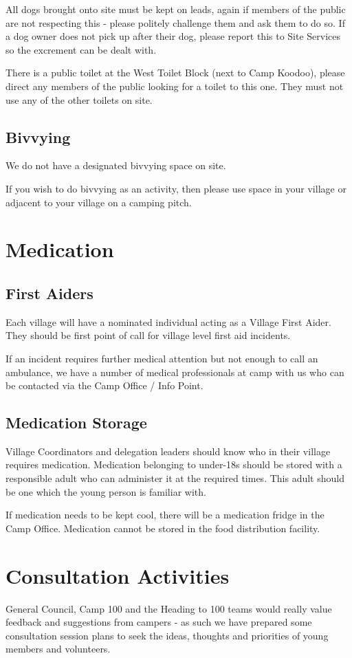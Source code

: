 \documentclass[a4paper, 11pt]{report}
\begin{document}
All dogs brought onto site must be kept on leads, again if members of the public are not respecting this - please politely challenge them and ask them to do so. If a dog owner does not pick up after their dog, please report this to Site Services so the excrement can be dealt with. \nl

There is a public toilet at the West Toilet Block (next to Camp Koodoo), please direct any members of the public looking for a toilet to this one. They must not use any of the other toilets on site.

\section{Bivvying}
We do not have a designated bivvying space on site.\nl

If you wish to do bivvying as an activity, then please use space in your village or adjacent to your village on a camping pitch.

\chapter{Medication}
\section{First Aiders}
Each village will have a nominated individual acting as a Village First Aider. They should be first point of call for village level first aid incidents.\nl

If an incident requires further medical attention but not enough to call an ambulance, we have a number of medical professionals at camp with us who can be contacted via the Camp Office / Info Point.

\section{Medication Storage}
Village Coordinators and delegation leaders should know who in their village requires medication. Medication belonging to under-18s should be stored with a responsible adult who can administer it at the required times. This adult should be one which the young person is familiar with.\nl

If medication needs to be kept cool, there will be a medication fridge in the Camp Office. Medication cannot be stored in the food distribution facility. 

\chapter{Consultation Activities}
General Council, Camp 100 and the Heading to 100 teams would really value feedback and suggestions from campers - as such we have prepared some consultation session plans to seek the ideas, thoughts and priorities of young members and volunteers.\nl
\end{document}

